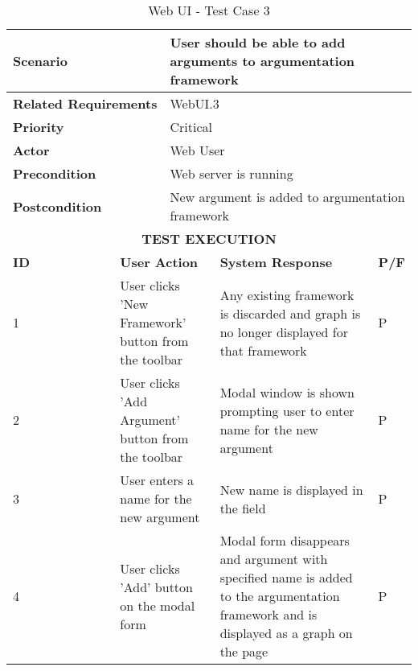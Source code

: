 \begin{longtable}[c]{p{}|p{}|p{}|p{}|p{}}
	\caption{Web UI - Test Case 3}
	\label{table:testcase3} \\
	\hline
	\multicolumn{2}{p{0.3\textwidth}}{\textbf{Scenario}} & \multicolumn{3}{p{0.7\textwidth}}{User should be able to add arguments to argumentation framework} \\ 
	\hline
	\endfirsthead
	\endhead
	\multicolumn{2}{p{0.4\textwidth}}{\textbf{Related Requirements}} & \multicolumn{3}{p{0.6\textwidth}}{WebUI.3} \\ 
	\hline
	\multicolumn{2}{p{0.4\textwidth}}{\textbf{Priority}} & \multicolumn{3}{p{0.6\textwidth}}{Critical} \\ 
	\hline
	\multicolumn{2}{p{0.3\textwidth}}{\textbf{Actor}} & \multicolumn{3}{p{0.7\textwidth}}{Web User} \\ 
	\hline
	\multicolumn{2}{p{0.3\textwidth}}{\textbf{Precondition}} & \multicolumn{3}{p{0.7\textwidth}}{Web server is running} \\ 
	\hline
	\multicolumn{2}{p{0.3\textwidth}}{\textbf{Postcondition}} & \multicolumn{3}{p{0.7\textwidth}}{New argument is added to argumentation framework} \\ 
	\hline
	\multicolumn{5}{c}{\cellcolor{grey}\textbf{TEST EXECUTION}} \\ 
	\hline
	\textbf{ID} & \multicolumn{2}{|p{0.4\textwidth}|}{\textbf{User Action}} & \textbf{System Response} & \textbf{P/F} \\ 
	\hline
	1 & \multicolumn{2}{|p{0.4\textwidth}|}{User clicks 'New Framework' button from the toolbar} & Any existing framework is discarded and graph is no longer displayed for that framework & P \\ 
	\hline
	2 & \multicolumn{2}{|p{0.4\textwidth}|}{User clicks 'Add Argument' button from the toolbar} & Modal window is shown prompting user to enter name for the new argument & P \\ 
	\hline
	3 & \multicolumn{2}{|p{0.4\textwidth}|}{User enters a name for the new argument} & New name is displayed in the field & P \\ 
	\hline
	4 & \multicolumn{2}{|p{0.4\textwidth}|}{User clicks 'Add' button on the modal form} & Modal form disappears and argument with specified name is added to the argumentation framework and is displayed as a graph on the page & P \\ 
	\hline
\end{longtable}

